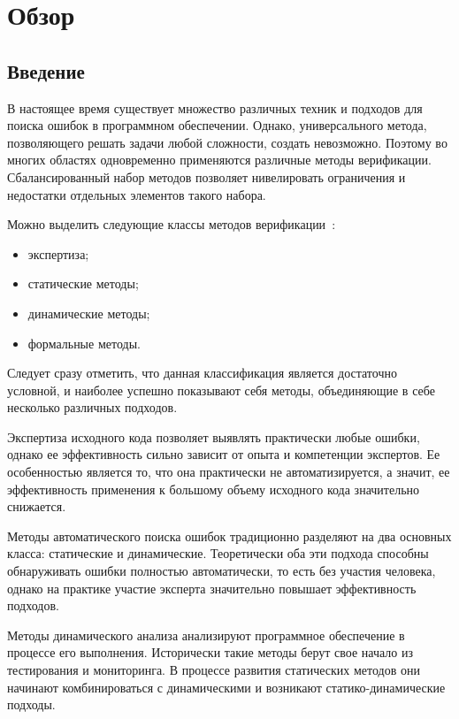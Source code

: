 \chapter{Обзор}
\label{chapter_related_work}

\section{Введение}
\label{rw:introduction}


В настоящее время существует множество различных техник и подходов для поиска ошибок в программном обеспечении.
Однако, универсального метода, позволяющего решать задачи любой сложности, создать невозможно.
Поэтому во многих областях одновременно применяются различные методы верификации.
Сбалансированный набор методов позволяет нивелировать ограничения и недостатки отдельных элементов такого набора.

Можно выделить следующие классы методов верификации~\cite{VerificationMethods}:

\begin{itemize}
\item экспертиза;
\item статические методы;
\item динамические методы;
\item формальные методы.
\end{itemize}

Следует сразу отметить, что данная классификация является достаточно условной, и наиболее успешно показывают себя методы, объединяющие в себе несколько различных подходов. 

Экспертиза исходного кода позволяет выявлять практически любые ошибки, однако ее эффективность сильно зависит от опыта и компетенции экспертов.
Ее особенностью является то, что она практически не автоматизируется, а значит, ее эффективность применения к большому объему исходного кода значительно снижается.

Методы автоматического поиска ошибок традиционно разделяют на два основных класса: статические и динамические. 
Теоретически оба эти подхода способны обнаруживать ошибки полностью автоматически, то есть без участия человека, однако на практике участие эксперта значительно повышает эффективность подходов.

Методы динамического анализа анализируют программное обеспечение в процессе его выполнения. 
Исторически такие методы берут свое начало из тестирования и мониторинга.
В процессе развития статических методов они начинают комбинироваться с динамическими и возникают статико-динамические подходы.

